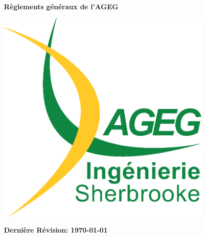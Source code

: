 \begin{titlepage}
\begin{center}

\vfill~\\[1cm]
{\Huge \bfseries Règlements généraux de l'AGEG}

\vfill

\includegraphics[width=0.8\textwidth]{./Images/A11-LogoAGEG-002-AJC.eps}~\\[1cm]

\vfill

{\bfseries \LARGE Dernière Révision: \today}

\end{center}
\end{titlepage}
